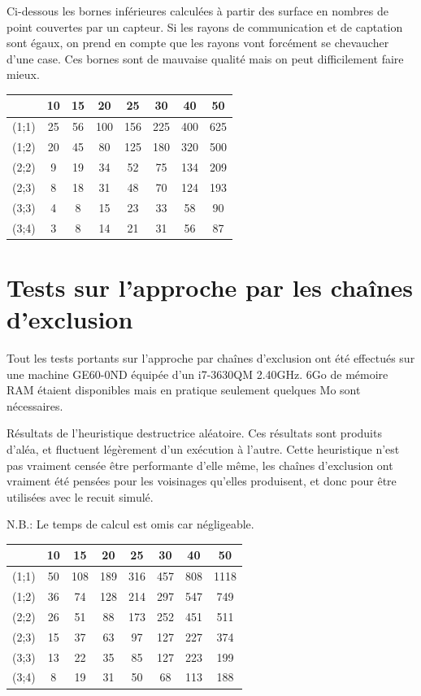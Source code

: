 \documentclass[12pt,a4paper]{article}
\begin{document}
Ci-dessous les bornes inférieures calculées à partir des surface en nombres de point couvertes par un capteur. Si les rayons de communication et de captation sont égaux, on prend en compte que les rayons vont forcément se chevaucher d'une case. Ces bornes sont de mauvaise qualité mais on peut difficilement faire mieux.

\begin{center}
\begin{tabular}{|c|c|c|c|c|c|c|c|}
\hline
&10 & 15 & 20 & 25 & 30 & 40 & 50\\
\hline 
(1;1) & 25 & 56 & 100 & 156 & 225 & 400 & 625 \\ 
\hline 
(1;2) & 20 & 45 & 80 & 125 & 180 & 320 & 500 \\ 
\hline 
(2;2) & 9 & 19 & 34 & 52 & 75 & 134 & 209 \\ 
\hline 
(2;3) & 8 & 18 & 31 & 48 & 70 & 124 & 193 \\ 
\hline 
(3;3) & 4 & 8 & 15 & 23 & 33 & 58 & 90 \\ 
\hline 
(3;4) & 3 & 8 & 14 & 21 & 31 & 56 & 87 \\ 
\hline 
\end{tabular} 
\end{center}

\section{Tests sur l'approche par les chaînes d'exclusion}
Tout les tests portants sur l'approche par chaînes d'exclusion ont été effectués sur une machine GE60-0ND équipée d'un i7-3630QM 2.40GHz. 6Go de mémoire RAM étaient disponibles mais en pratique seulement quelques Mo sont nécessaires.

Résultats de l'heuristique destructrice aléatoire. Ces résultats sont produits d'aléa, et fluctuent légèrement d'un exécution à l'autre. Cette heuristique n'est pas vraiment censée être performante d'elle même, les chaînes d'exclusion ont vraiment été pensées pour les voisinages qu'elles produisent, et donc pour être utilisées avec le recuit simulé. 

N.B.: Le temps de calcul est omis car négligeable.
\begin{center}
\begin{tabular}{|c|c|c|c|c|c|c|c|}
\hline
&10 & 15 & 20 & 25 & 30 & 40 & 50\\
\hline 
(1;1) & 50 & 108 & 189 & 316 & 457 & 808 & 1118 \\ 
\hline 
(1;2) & 36 & 74 & 128 & 214 & 297 & 547 & 749 \\ 
\hline 
(2;2) & 26 & 51 & 88 & 173 & 252 & 451 & 511 \\ 
\hline 
(2;3) & 15 & 37 & 63 & 97 & 127 & 227 & 374 \\ 
\hline 
(3;3) & 13 & 22 & 35 & 85 & 127 & 223 & 199 \\ 
\hline 
(3;4) & 8 & 19 & 31 & 50 & 68 & 113 & 188 \\ 
\hline 
\end{tabular} 
\end{center}
\end{document}
